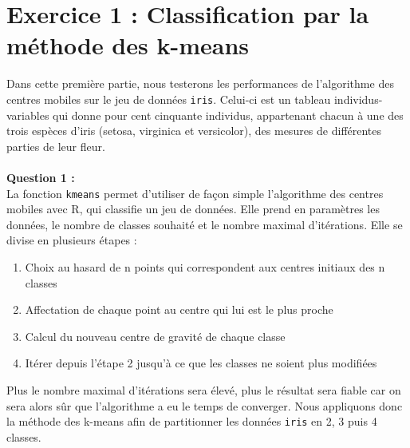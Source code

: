 \documentclass[a4paper, 10pt]{article}
\begin{document}
\section*{Exercice 1 : Classification par la méthode des k-means}
Dans cette première partie, nous testerons les performances de l'algorithme des centres mobiles sur le jeu de données \texttt{iris}.
Celui-ci est un tableau individus-variables qui donne pour cent cinquante individus,
appartenant chacun à une des trois espèces d'iris (setosa, virginica et versicolor), des mesures de différentes parties de leur fleur.\\ \\
\textbf{Question 1 :}\\
La fonction \texttt{kmeans} permet d'utiliser de façon simple l'algorithme des centres mobiles avec R, qui classifie un jeu de données.
Elle prend en paramètres les données, le nombre de classes souhaité et le nombre maximal d'itérations.
Elle se divise en plusieurs étapes :
\begin{enumerate}
\item Choix au hasard de n points qui correspondent aux centres initiaux des n classes
\item Affectation de chaque point au centre qui lui est le plus proche
\item Calcul du nouveau centre de gravité de chaque classe
\item Itérer depuis l'étape 2 jusqu'à ce que les classes ne soient plus modifiées
\end{enumerate}
Plus le nombre maximal d'itérations sera élevé, plus le résultat sera fiable car on sera alors sûr que l'algorithme a eu le temps de converger.
\newpage
\noindent
Nous appliquons donc la méthode des k-means afin de partitionner les données \texttt{iris} en 2, 3 puis 4 classes. 
\end{document}
